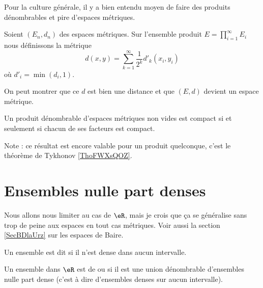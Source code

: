 Pour la culture générale, il y a bien entendu moyen de faire des produits dénombrables et pire d'espaces métriques.
\begin{definition}
    Soient \( (E_n,d_n)\) des espaces métriques. Sur l'ensemble produit \( E=\prod_{i=1}^{\infty}E_i\) nous définissons la métrique
    \begin{equation}
        d(x,y)=\sum_{k=1}^{\infty}\frac{1}{ 2^k }d'_k(x_i,y_i)
    \end{equation}
    où \( d'_i=\min(d_i,1)\).
\end{definition}
On peut montrer que ce \( d\) est bien une distance et que \( (E,d)\) devient un espace métrique.

\begin{theorem} \label{ThoKKBooNaZgoO}  %
    Un produit dénombrable d'espaces métriques non vides est compact si et seulement si chacun de ses facteurs est compact.
\end{theorem}
Note : ce résultat est encore valable pour un produit quelconque, c'est le théorème de Tykhonov \ref{ThoFWXsQOZ}.

\section{Ensembles nulle part denses}

Nous allons nous limiter au cas de \( \eR\), mais je crois que ça se généralise sans trop de peine aux espaces en tout cas métriques. Voir aussi la section \ref{SecBDlaUrz} sur les espaces de Baire.

\begin{definition}
    Un ensemble est dit  si il n'est dense dans aucun intervalle.

    Un ensemble dans \( \eR\) est de  ou  si il est une union dénombrable d'ensembles nulle part dense (c'est à dire d'ensembles denses sur aucun intervalle).
\end{definition}

